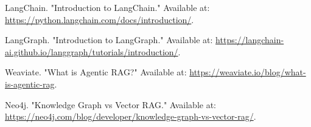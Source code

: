 \documentclass[12pt,a4paper,twoside,openright,justified]{book}
\begin{document}
\begin{thebibliography}{99}
LangChain. "Introduction to LangChain." 
Available at: \url{https://python.langchain.com/docs/introduction/}.

LangGraph. "Introduction to LangGraph." 
Available at: \url{https://langchain-ai.github.io/langgraph/tutorials/introduction/}.

Weaviate. "What is Agentic RAG?" 
Available at: \url{https://weaviate.io/blog/what-is-agentic-rag}.

Neo4j. "Knowledge Graph vs Vector RAG." 
Available at: \url{https://neo4j.com/blog/developer/knowledge-graph-vs-vector-rag/}.
\end{thebibliography}








\end{document}

